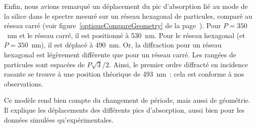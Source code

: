 Enfin, nous avions remarqué un déplacement du pic d'absorption lié au mode de la silice dans le spectre mesuré sur un réseau hexagonal de particules, comparé au réseau carré (voir figure~\ref{optiqueCompareGeometry} de la page~\pageref{optiqueCompareGeometry}). Pour $P = 350$~nm et le réseau carré, il est positionné à 530~nm. Pour le réseau hexagonal (et $P=350$~nm), il est déplacé à 490~nm. Or, la diffraction pour un réseau hexagonal est légèrement différente que pour un réseau carré. Les rangées de particules sont espacées de $P\sqrt{3}/2$. Ainsi, le premier ordre diffracté en incidence rasante se trouve à une position théorique de 493~nm~: cela est conforme à nos observations.\par 

Ce modèle rend bien compte du changement de période, mais aussi de géométrie. Il explique les déplacements des différents pics d'absorption, aussi bien pour les données simulées qu'expérimentales.\par 


